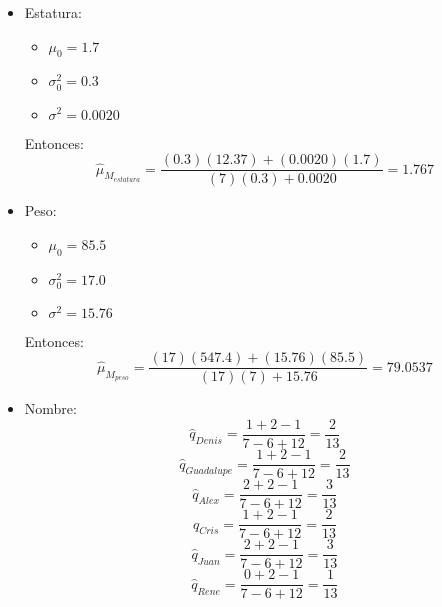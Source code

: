 \documentclass[letterpaper,12pt]{article}
\theoremstyle{definition}
\begin{document}
\begin{itemize}
  \item Estatura:
  \begin{itemize}
    \item \(\mu_0 = 1.7\)
    \item \(\sigma^2_0 = 0.3\)
    \item \(\sigma^2 = 0.0020\)
  \end{itemize}
  
  Entonces:\\
  
  \begin{equation}
    \hat{\mu}_{M_{estatura}} = \frac{(0.3)(12.37) + (0.0020)(1.7)}{(7)(0.3) + 0.0020} = 1.767
  \end{equation}
  \item Peso:
  \begin{itemize}
    \item \(\mu_0 = 85.5\)
    \item \(\sigma^2_0 = 17.0\)
    \item \(\sigma^2 = 15.76\)
  \end{itemize}
  
  Entonces:\\
  
  \begin{equation}
    \hat{\mu}_{M_{peso}} = \frac{(17)(547.4) + (15.76)(85.5)}{(17)(7) + 15.76} = 79.0537
  \end{equation}
  \item Nombre:
  \begin{equation}
    \hat{q}_{Denis} = \frac{1+2-1}{7-6+12} = \frac{2}{13} 
  \end{equation}
  \begin{equation}
    \hat{q}_{Guadalupe} = \frac{1+2-1}{7-6+12} = \frac{2}{13} 
  \end{equation}
  \begin{equation}
    \hat{q}_{Alex} = \frac{2+2-1}{7-6+12} = \frac{3}{13} 
  \end{equation}
  \begin{equation}
    \hat{q}_{Cris} = \frac{1+2-1}{7-6+12} = \frac{2}{13} 
  \end{equation}
  \begin{equation}
    \hat{q}_{Juan} = \frac{2+2-1}{7-6+12} = \frac{3}{13} 
  \end{equation}
  \begin{equation}
    \hat{q}_{Rene} = \frac{0+2-1}{7-6+12} = \frac{1}{13} 
  \end{equation}
\end{itemize}
\end{document}

